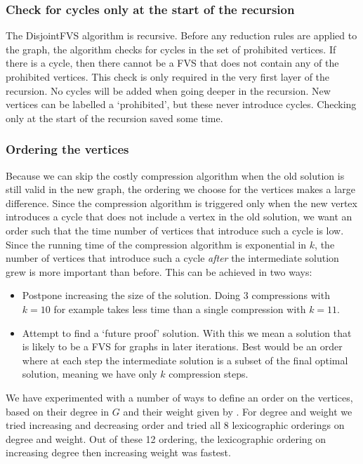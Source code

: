 \subsubsection{Check for cycles only at the start of the recursion}
The {\sc DisjointFVS} algorithm is recursive. Before any reduction rules are applied to the graph, the algorithm checks for cycles in the set of prohibited vertices. If there is a cycle, then there cannot be a FVS that does not contain any of the prohibited vertices. This check is only required in the very first layer of the recursion. No cycles will be added when going deeper in the recursion. New vertices can be labelled a `prohibited', but these never introduce cycles. Checking only at the start of the recursion saved some time.

\subsubsection{Ordering the vertices}
Because we can skip the costly compression algorithm when the old solution is still valid in the new graph, the ordering we choose for the vertices makes a large difference. Since the compression algorithm is triggered only when the new vertex introduces a cycle that does not include a vertex in the old solution, we want an order such that the time number of vertices that introduce such a cycle is low. Since the running time of the compression algorithm is exponential in $k$, the number of vertices that introduce such a cycle \emph{after} the intermediate solution grew is more important than before. This can be achieved in two ways:
\begin{itemize}
 \item Postpone increasing the size of the solution. Doing $3$ compressions with $k=10$ for example takes less time than a single compression with $k=11$.
 \item Attempt to find a `future proof' solution. With this we mean a solution that is likely to be a FVS for graphs in later iterations. Best would be an order where at each step the intermediate solution is a subset of the final optimal solution, meaning we have only $k$ compression steps.
\end{itemize}
We have experimented with a number of ways to define an order on the vertices, based on their degree in $G$ and their weight given by . For degree and weight we tried increasing and decreasing order and tried all 8 lexicographic orderings on degree and weight. Out of these 12 ordering, the lexicographic ordering on increasing degree then increasing weight was fastest.

